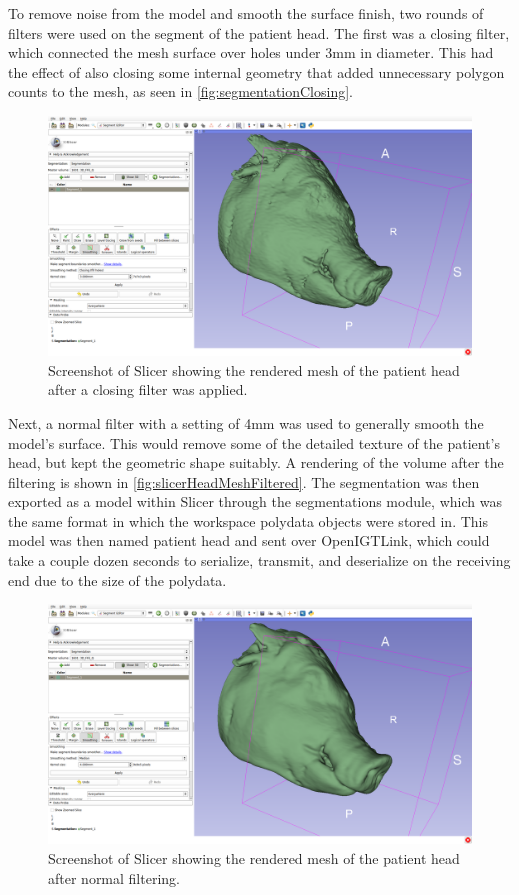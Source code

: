\documentclass[12pt]{report}
\begin{document}
To remove noise from the model and smooth the surface finish, two rounds of filters were used on the segment of the patient head. The first was a closing filter, which connected the mesh surface over holes under 3mm in diameter. This had the effect of also closing some internal geometry that added unnecessary polygon counts to the mesh, as seen in \autoref{fig:segmentationClosing}.

\begin{figure}[thpb]
	\centering
	\includegraphics[width=\textwidth]{images/segmentation_closing.png}
    \caption{Screenshot of Slicer showing the rendered mesh of the patient head after a closing filter was applied.}
    \label{fig:segmentationClosing}
\end{figure}

Next, a normal filter with a setting of 4mm was used to generally smooth the model's surface. This would remove some of the detailed texture of the patient's head, but kept the geometric shape suitably. A rendering of the volume after the filtering is shown in \autoref{fig:slicerHeadMeshFiltered}. The segmentation was then exported as a model within Slicer through the segmentations module, which was the same format in which the workspace polydata objects were stored in. This model was then named patient head and sent over OpenIGTLink, which could take a couple dozen seconds to serialize, transmit, and deserialize on the receiving end due to the size of the polydata.

\begin{figure}[thpb]
	\centering
	\includegraphics[width=\textwidth]{images/segmentation_smoothing.png}
    \caption{Screenshot of Slicer showing the rendered mesh of the patient head after normal filtering.}
    \label{fig:slicerHeadMeshFiltered}
\end{figure}
\end{document}
